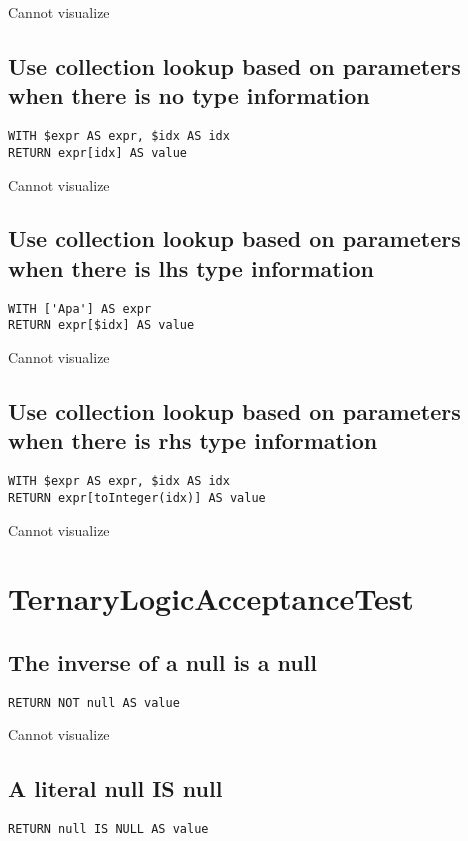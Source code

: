 Cannot visualize
\subsection{Use collection lookup based on parameters when there is no type information}

\begin{lstlisting}
WITH $expr AS expr, $idx AS idx
RETURN expr[idx] AS value
\end{lstlisting}

Cannot visualize
\subsection{Use collection lookup based on parameters when there is lhs type information}

\begin{lstlisting}
WITH ['Apa'] AS expr
RETURN expr[$idx] AS value
\end{lstlisting}

Cannot visualize
\subsection{Use collection lookup based on parameters when there is rhs type information}

\begin{lstlisting}
WITH $expr AS expr, $idx AS idx
RETURN expr[toInteger(idx)] AS value
\end{lstlisting}

Cannot visualize
\section{TernaryLogicAcceptanceTest}

\subsection{The inverse of a null is a null}

\begin{lstlisting}
RETURN NOT null AS value
\end{lstlisting}

Cannot visualize
\subsection{A literal null IS null}

\begin{lstlisting}
RETURN null IS NULL AS value
\end{lstlisting}

